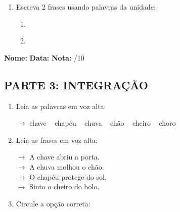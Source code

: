 \begin{exercicio}
\begin{enumerate}[resume]
  \item Escreva 2 frases usando palavras da unidade:
  \begin{enumerate}[label=\alph*)]
    \item \underline{\hspace{8cm}}
    \item \underline{\hspace{8cm}}
  \end{enumerate}

\end{enumerate}

\end{exercicio}



\begin{exercicio}

\noindent\textbf{Nome:} \underline{\hspace{3.2cm}} \quad \textbf{Data:} \underline{\hspace{1.6cm}} \quad \textbf{Nota:} \underline{\hspace{0.9cm}}/10


\subsection*{PARTE 3: INTEGRAÇÃO}

\begin{enumerate}[resume]

  \item Leia as palavras em voz alta:
  \begin{center}
  $\rightarrow$ chave ~ chapéu ~ chuva ~ chão ~ cheiro ~ choro
  \end{center}

  \item Leia as frases em voz alta:
  \begin{center}
  $\rightarrow$ A chave abriu a porta.\\
  $\rightarrow$ A chuva molhou o chão.\\
  $\rightarrow$ O chapéu protege do sol.\\
  $\rightarrow$ Sinto o cheiro do bolo.\\
  \end{center}

  \item Circule a opção correta:
  \begin{enumerate}[label=(\alph*)]


\end{enumerate}
\end{enumerate}
\end{exercicio}
